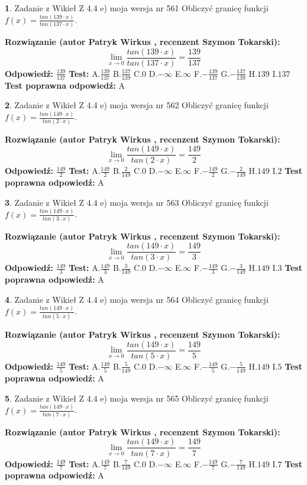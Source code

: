 \documentclass[12pt, a4paper]{article}
\theoremstyle{definition} %
\newtheorem{zad}{}
\newcommand{\zadStart}[1]{\begin{zad}#1\newline}
\newcommand{\zadStop}{\end{zad}}
\newcommand{\rozwStart}[2]{\noindent \textbf{Rozwiązanie (autor #1 , recenzent #2): }\newline}
\newcommand{\rozwStop}{\newline}
\newcommand{\odpStart}{\noindent \textbf{Odpowiedź:}\newline}
\newcommand{\odpStop}{\newline}
\newcommand{\testStart}{\noindent \textbf{Test:}\newline}
\newcommand{\testStop}{\newline}
\newcommand{\kluczStart}{\noindent \textbf{Test poprawna odpowiedź:}\newline}
\newcommand{\kluczStop}{\newline}
\begin{document}
\zadStart{Zadanie z Wikieł Z 4.4 e) moja wersja nr 561}
Obliczyć granicę funkcji $f(x)=\frac{tan(139\cdot x)}{tan(137\cdot x)}$.
\zadStop
\rozwStart{Patryk Wirkus}{Szymon Tokarski}
$$\lim\limits_{x\to 0}\frac{tan(139\cdot x)}{tan(137\cdot x)}=
\frac{139}{137}$$
\rozwStop
\odpStart
$\frac{139}{137}$
\odpStop
\testStart
A.$\frac{139}{137}$
B.$\frac{137}{139}$
C.$0$
D.$-\infty$
E.$\infty$
F.$-\frac{139}{137}$
G.$-\frac{137}{139}$
H.$139$
I.$137$
\testStop
\kluczStart
A
\kluczStop



\zadStart{Zadanie z Wikieł Z 4.4 e) moja wersja nr 562}
Obliczyć granicę funkcji $f(x)=\frac{tan(149\cdot x)}{tan(2\cdot x)}$.
\zadStop
\rozwStart{Patryk Wirkus}{Szymon Tokarski}
$$\lim\limits_{x\to 0}\frac{tan(149\cdot x)}{tan(2\cdot x)}=
\frac{149}{2}$$
\rozwStop
\odpStart
$\frac{149}{2}$
\odpStop
\testStart
A.$\frac{149}{2}$
B.$\frac{2}{149}$
C.$0$
D.$-\infty$
E.$\infty$
F.$-\frac{149}{2}$
G.$-\frac{2}{149}$
H.$149$
I.$2$
\testStop
\kluczStart
A
\kluczStop



\zadStart{Zadanie z Wikieł Z 4.4 e) moja wersja nr 563}
Obliczyć granicę funkcji $f(x)=\frac{tan(149\cdot x)}{tan(3\cdot x)}$.
\zadStop
\rozwStart{Patryk Wirkus}{Szymon Tokarski}
$$\lim\limits_{x\to 0}\frac{tan(149\cdot x)}{tan(3\cdot x)}=
\frac{149}{3}$$
\rozwStop
\odpStart
$\frac{149}{3}$
\odpStop
\testStart
A.$\frac{149}{3}$
B.$\frac{3}{149}$
C.$0$
D.$-\infty$
E.$\infty$
F.$-\frac{149}{3}$
G.$-\frac{3}{149}$
H.$149$
I.$3$
\testStop
\kluczStart
A
\kluczStop



\zadStart{Zadanie z Wikieł Z 4.4 e) moja wersja nr 564}
Obliczyć granicę funkcji $f(x)=\frac{tan(149\cdot x)}{tan(5\cdot x)}$.
\zadStop
\rozwStart{Patryk Wirkus}{Szymon Tokarski}
$$\lim\limits_{x\to 0}\frac{tan(149\cdot x)}{tan(5\cdot x)}=
\frac{149}{5}$$
\rozwStop
\odpStart
$\frac{149}{5}$
\odpStop
\testStart
A.$\frac{149}{5}$
B.$\frac{5}{149}$
C.$0$
D.$-\infty$
E.$\infty$
F.$-\frac{149}{5}$
G.$-\frac{5}{149}$
H.$149$
I.$5$
\testStop
\kluczStart
A
\kluczStop



\zadStart{Zadanie z Wikieł Z 4.4 e) moja wersja nr 565}
Obliczyć granicę funkcji $f(x)=\frac{tan(149\cdot x)}{tan(7\cdot x)}$.
\zadStop
\rozwStart{Patryk Wirkus}{Szymon Tokarski}
$$\lim\limits_{x\to 0}\frac{tan(149\cdot x)}{tan(7\cdot x)}=
\frac{149}{7}$$
\rozwStop
\odpStart
$\frac{149}{7}$
\odpStop
\testStart
A.$\frac{149}{7}$
B.$\frac{7}{149}$
C.$0$
D.$-\infty$
E.$\infty$
F.$-\frac{149}{7}$
G.$-\frac{7}{149}$
H.$149$
I.$7$
\testStop
\kluczStart
A
\kluczStop
\end{document}
